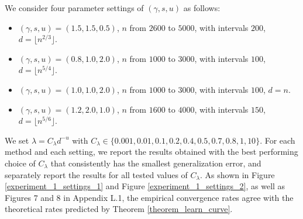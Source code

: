 \documentclass{article}
\theoremstyle{plain}
\theoremstyle{definition}
\theoremstyle{remark}
\begin{document}
 We consider four parameter settings of  $(\gamma, s, u)$ as follows:
\begin{itemize}
    \item $(\gamma, s, u) =(1.5, 1.5, 0.5)$, $n$ from $2600$ to $5000$, with intervals $200$, $d = \lfloor n^{2/3} \rfloor$.

    \item $(\gamma, s, u) =(0.8, 1.0, 2.0)$, $n$ from $1000$ to $3000$, with intervals $100$, $d = \lfloor n^{5/4} \rfloor$.

    \item $(\gamma, s, u) =(1.0, 1.0, 2.0)$, $n$ from $1000$ to $3000$, with intervals $100$, $d = n$.

    \item $(\gamma, s, u) =(1.2, 2.0, 1.0)$, $n$ from $1600$ to $4000$, with intervals $150$, $d = \lfloor n^{5/6} \rfloor$.
    
\end{itemize}
We set $\lambda = C_{\lambda} d^{-u}$ with $C_{\lambda} \in \{0.001, 0.01, 0.1, 0.2, 0.4, 0.5, 0.7, 0.8, 1, 10\}$.
For each method and each setting, we report the results obtained with the best performing choice of $C_{\lambda}$ that consistently has the smallest generalization error, and separately report the results for all tested values of $C_{\lambda}$. 
As shown in 
Figure \ref{experiment_1_settings_1} and 
Figure \ref{experiment_1_settings_2}, as well as Figures 7 and 8 in Appendix L.1,
the empirical convergence rates agree with the theoretical rates predicted by Theorem \ref{theorem_learn_curve}.
\end{document}
